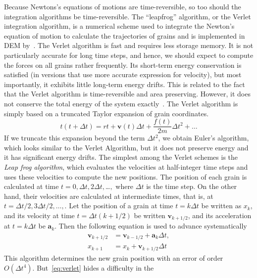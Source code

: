 Because Newtons's equations of motions are time-reversible, so too should the 
integration algorithms be time-reversible. The ``leapfrog'' algorithm, or the 
Verlet integration algorithm, is a numerical scheme used to integrate the 
Newton's equation of motion to calculate the trajectories of grains and is 
implemented in DEM by~\citet{Verlet1967}. The Verlet algorithm is 
fast and requires less storage memory. It is not particularly accurate for long 
time steps, and hence, we should expect to compute the forces on all grains 
rather frequently. Its short-term energy conservation is satisfied (in versions 
that use more accurate expression for velocity), but most importantly, it 
exhibits little long-term energy drifts. This is related to the fact that the 
Verlet algorithm is time-reversible and area preserving. However, it does not 
conserve the total energy of the system exactly~\citep{Frenkel1996}. The Verlet 
algorithm is simply based on a truncated Taylor expansion of grain 
coordinates. 
%
\begin{equation}
t(t+\Delta t)=r{t} +\mathbf{v}(t) \Delta t + \frac{f(t)}{2\mathit{m}} \Delta 
t^{2}+ \dots
\end{equation}
%
If we truncate this expansion beyond the term $\Delta t^{2}$, we obtain Euler's 
algorithm, which looks similar to the Verlet Algorithm, but it does not 
preserve energy and it has significant energy drifts. The simplest among the 
Verlet schemes is the \textit{Leap frog algorithm}, which evaluates the 
velocities at half-integer time steps and uses these velocities to compute the 
new positions. The position of each grain is calculated at time $t=0, \Delta t, 
2\Delta t, $\dots$ ,$ where $\Delta t$ is the time step. On the other hand, 
their velocities are calculated at intermediate times, that is, at $t=\Delta 
t/2, 3 \Delta t/2, \dots,$. Let the position of a grain at time $t=k\Delta t$ 
be written as $x_{\mathit{k}}$, and its velocity at time $t=\Delta t (k + 
1/2)$ be written $\mathbf{v}_{\mathit{k + 1/2}}$, and its acceleration at $t=k 
\Delta t$ be $\mathbf{a}_{\mathit{k}}$. Then the following equation is used to 
advance systematically
%
\begin{align}\label{eq:verlet}
\mathbf{v}_{\mathit{k}+1/2} & 
=\mathbf{v}_{\mathit{k}-1/2}+\mathbf{a}_{\mathit{k}}
 \Delta t, \\
x_{\mathit{k}+1} & =x_{\mathit{k}}+\mathbf{v}_{\mathit{k}+1/2} \Delta t
\end{align}
%
This algorithm determines the new grain position with an error of order 
$\mathit{O}( \Delta t^{4})$. But~\cref{eq:verlet} hides a difficulty in the 
